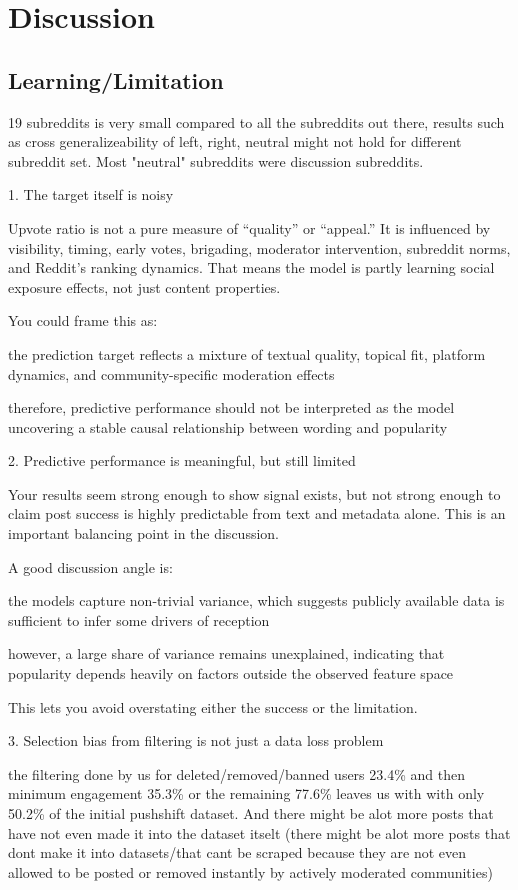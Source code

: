 \chapter{Discussion}
\section{Learning/Limitation}

19 subreddits is very small compared to all the subreddits out there, results such as cross generalizeability of left, right, neutral might not hold for different subreddit set. Most "neutral" subreddits were discussion subreddits. 


1. The target itself is noisy

Upvote ratio is not a pure measure of “quality” or “appeal.” It is influenced by visibility, timing, early votes, brigading, moderator intervention, subreddit norms, and Reddit’s ranking dynamics. That means the model is partly learning social exposure effects, not just content properties.

You could frame this as:

the prediction target reflects a mixture of textual quality, topical fit, platform dynamics, and community-specific moderation effects

therefore, predictive performance should not be interpreted as the model uncovering a stable causal relationship between wording and popularity


2. Predictive performance is meaningful, but still limited

Your results seem strong enough to show signal exists, but not strong enough to claim post success is highly predictable from text and metadata alone. This is an important balancing point in the discussion.

A good discussion angle is:

the models capture non-trivial variance, which suggests publicly available data is sufficient to infer some drivers of reception

however, a large share of variance remains unexplained, indicating that popularity depends heavily on factors outside the observed feature space

This lets you avoid overstating either the success or the limitation.


3. Selection bias from filtering is not just a data loss problem

the filtering done by us for deleted/removed/banned users 23.4\% and then minimum engagement 35.3\% or the remaining 77.6\% leaves us with with only 50.2\% of the initial pushshift dataset. And there might be alot more posts that have not even made it into the dataset itselt (there might be alot more posts that dont make it into datasets/that cant be scraped because they are not even allowed to be posted or removed instantly by actively moderated communities)

